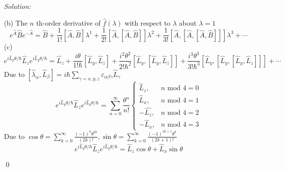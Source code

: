 \documentclass[12pt]{article}
\newenvironment{sol}
    {\emph{Solution:}
    }
    {
    \qed
    }
\begin{document}
\begin{sol}
\begin{equation}
\end{equation}
(b) The $n$ th-order derivative of $\hat{f}(\lambda)$ with respect to $\lambda$ about $\lambda=1$
\begin{equation}
e^{\hat{A}}\hat{B}e^{-\hat{A}}=\hat{B}+\frac{1}{1!}[\hat{A},\hat{B}]\lambda^1+\frac{1}{2!}[\hat{A},[\hat{A},\hat{B}]]\lambda^2+\frac{1}{3!}[\hat{A},[\hat{A},[\hat{A},\hat{B}]]]\lambda^3+\cdots
\end{equation}
(c)
\begin{equation}
e^{i\hat{L}_y\theta/\hbar}\hat{L}_ze^{i\hat{L}_y\theta/\hbar}=\hat{L}_z+\frac{i\theta}{1!\hbar}[\hat{L}_y,\hat{L}_z]+\frac{i^2\theta^2}{2!\hbar^2}[\hat{L}_y,[\hat{L}_y,\hat{L}_z]]+\frac{i^3\theta^3}{3!\hbar^3}[\hat{L}_y,[\hat{L}_y,[\hat{L}_y,\hat{L}_z]]]+\cdots
\end{equation}
Due to $[\hat{\lambda}_{\alpha},\hat{L}_{\beta}]=i\hbar\sum_{\gamma=x,y,z}\varepsilon_{\alpha\beta\gamma}\hat{L}_{\gamma}$
\begin{equation}
e^{i\hat{L}_y\theta/\hbar}\hat{L}_ze^{i\hat{L}_y\theta/\hbar}=\sum_{n=0}^{\infty}\frac{\theta^n}{n!}\left\{\begin{array}{ll}\hat{L}_z,&n\text{ mod }4=0\\\hat{L}_x,&n\text{ mod }4=1\\-\hat{L_z},&n\text{ mod }4=2\\-\hat{L}_x,&n\text{ mod }4=3\end{array}\right.
\end{equation}
Due to $\cos\theta=\sum_{k=0}^{\infty}\frac{(-1)^k\theta^{2k}}{(2k)!},\sin\theta=\sum_{k=0}^{\infty}\frac{(-1)^{2k+1}\theta^k}{(2k+1)!}$
\begin{equation}
e^{i\hat{L}_y\theta/\hbar}\hat{L}_ze^{i\hat{L}_y\theta/\hbar}=\hat{L}_z\cos\theta+\hat{L}_x\sin\theta
\end{equation}
\end{sol}
\end{document}
